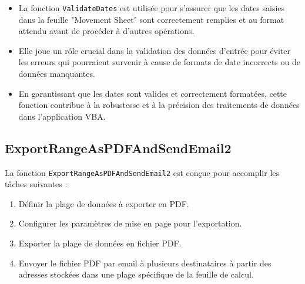 \documentclass[a4paper, oneside, 12pt, final]{extreport}
\begin{document}
\begin{itemize}
    \item La fonction \texttt{ValidateDates} est utilisée pour s'assurer que les dates saisies dans la feuille "Movement Sheet" sont correctement remplies et au format attendu avant de procéder à d'autres opérations.
    \item Elle joue un rôle crucial dans la validation des données d'entrée pour éviter les erreurs qui pourraient survenir à cause de formats de date incorrects ou de données manquantes.
    \item En garantissant que les dates sont valides et correctement formatées, cette fonction contribue à la robustesse et à la précision des traitements de données dans l'application VBA.
\end{itemize}
\subsection{ExportRangeAsPDFAndSendEmail2}

La fonction \texttt{ExportRangeAsPDFAndSendEmail2} est conçue pour accomplir les tâches suivantes :

\begin{enumerate}
    \item Définir la plage de données à exporter en PDF.
    \item Configurer les paramètres de mise en page pour l'exportation.
    \item Exporter la plage de données en fichier PDF.
    \item Envoyer le fichier PDF par email à plusieurs destinataires à partir des adresses stockées dans une plage spécifique de la feuille de calcul.
\end{enumerate}
\end{document}
